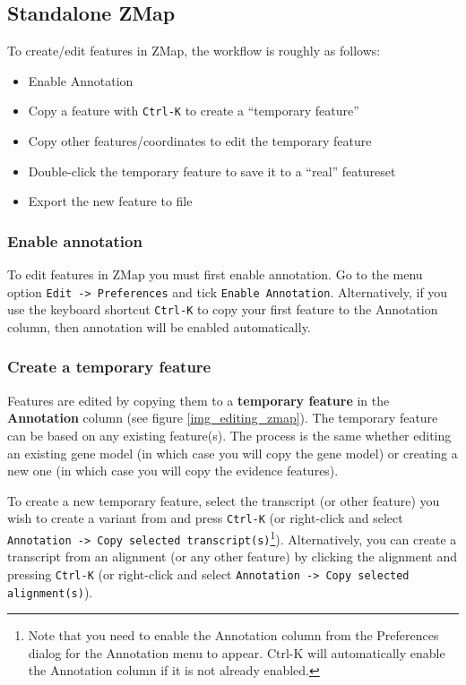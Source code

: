 \documentclass[letterpaper]{article}
\begin{document}
\subsection{Standalone ZMap}
To create/edit features in ZMap, the workflow is roughly as follows:
\begin{itemize}
\item Enable Annotation
\item Copy a feature with \lstinline{Ctrl-K} to create a ``temporary feature''
\item Copy other features/coordinates to edit the temporary feature
\item Double-click the temporary feature to save it to a ``real'' featureset
\item Export the new feature to file
\end{itemize}

\subsubsection{Enable annotation}
To edit features in ZMap you must first enable annotation. Go to the menu option \lstinline{Edit -> Preferences} and tick \lstinline{Enable Annotation}. Alternatively, if you use the keyboard shortcut \lstinline{Ctrl-K} to copy your first feature to the Annotation column, then annotation will be enabled automatically.

\subsubsection{Create a temporary feature}
Features are edited by copying them to a \textbf{temporary feature} in the \textbf{Annotation} column (see figure \ref{img_editing_zmap}). The temporary feature can be based on any existing feature(s). The process is the same whether editing an existing gene model (in which case you will copy the gene model) or creating a new one (in which case you will copy the evidence features).

To create a new temporary feature, select the transcript (or other feature) you wish to create a variant from and press \lstinline{Ctrl-K} (or right-click and select \lstinline{Annotation -> Copy selected transcript(s)}\footnote{Note that you need to enable the Annotation column from the Preferences dialog for the Annotation menu to appear. Ctrl-K will automatically enable the Annotation column if it is not already enabled.}). Alternatively, you can create a transcript from an alignment (or any other feature) by clicking the alignment and pressing \lstinline{Ctrl-K} (or right-click and select \lstinline{Annotation -> Copy selected alignment(s)}).
\end{document}

